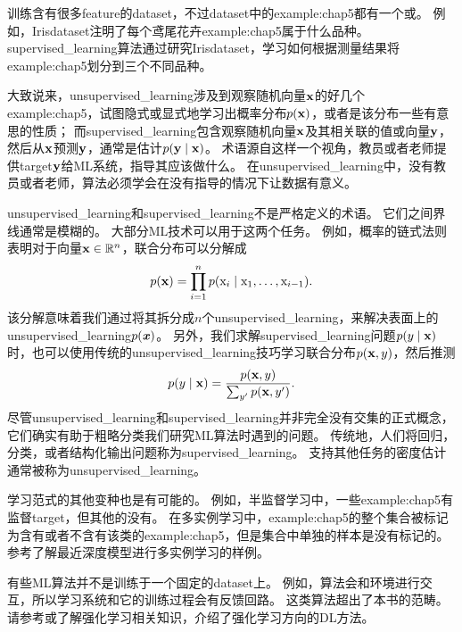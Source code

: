 训练含有很多\gls{feature}的\gls{dataset}，不过\gls{dataset}中的\gls{example:chap5}都有一个或。
例如，Iris\gls{dataset}注明了每个鸢尾花卉\gls{example:chap5}属于什么品种。
\gls{supervised_learning}算法通过研究Iris\gls{dataset}，学习如何根据测量结果将\gls{example:chap5}划分到三个不同品种。

大致说来，\gls{unsupervised_learning}涉及到观察随机向量$\mathbf{x}$的好几个\gls{example:chap5}，试图隐式或显式地学习出概率分布$p(\mathbf{x})$，或者是该分布一些有意思的性质；
而\gls{supervised_learning}包含观察随机向量$\mathbf{x}$及其相关联的值或向量$\mathbf{y}$，然后从$\mathbf{x}$预测$\mathbf{y}$，通常是估计$p(\mathbf{y}\mid\mathbf{x})$。
术语源自这样一个视角，教员或者老师提供\gls{target}$\mathbf{y}$给\gls{ML}系统，指导其应该做什么。
在\gls{unsupervised_learning}中，没有教员或者老师，算法必须学会在没有指导的情况下让数据有意义。

\gls{unsupervised_learning}和\gls{supervised_learning}不是严格定义的术语。
它们之间界线通常是模糊的。
大部分\gls{ML}技术可以用于这两个任务。
例如，概率的链式法则表明对于向量$\mathbf{x}\in\mathbb{R}^n$，联合分布可以分解成
\begin{equation}
    p(\mathbf{x}) = \prod_{i=1}^n p(\mathrm{x}_i \mid \mathrm{x}_1,\dots,\mathrm{x}_{i-1}) .
\end{equation}
该分解意味着我们通过将其拆分成$n$个\gls{unsupervised_learning}，来解决表面上的\gls{unsupervised_learning}$p(\boldsymbol{\mathit{x}})$。
另外，我们求解\gls{supervised_learning}问题$p(y\mid\mathbf{x})$时，也可以使用传统的\gls{unsupervised_learning}技巧学习联合分布$p(\mathbf{x},y)$，然后推测
\begin{equation}
    p(y\mid\mathbf{x}) = \frac{p(\mathbf{x},y)}{\sum_{y'}p(\mathbf{x},y')}.
\end{equation}
尽管\gls{unsupervised_learning}和\gls{supervised_learning}并非完全没有交集的正式概念，它们确实有助于粗略分类我们研究\gls{ML}算法时遇到的问题。
传统地，人们将回归，分类，或者结构化输出问题称为\gls{supervised_learning}。
支持其他任务的密度估计通常被称为\gls{unsupervised_learning}。


学习范式的其他变种也是有可能的。
例如，半监督学习中，一些\gls{example:chap5}有监督\gls{target}，但其他的没有。
在多实例学习中，\gls{example:chap5}的整个集合被标记为含有或者不含有该类的\gls{example:chap5}，但是集合中单独的样本是没有标记的。
参考\cite{Kotzias2015}了解最近深度模型进行多实例学习的样例。

有些\gls{ML}算法并不是训练于一个固定的\gls{dataset}上。
例如，算法会和环境进行交互，所以学习系统和它的训练过程会有反馈回路。
这类算法超出了本书的范畴。
请参考\cite{Sutton+Barto-98}或\cite{Bertsekas+Tsitsiklis-book1996}了解强化学习相关知识，\cite{Mnih2013}介绍了强化学习方向的\gls{DL}方法。

